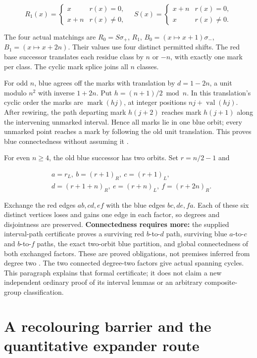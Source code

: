\documentclass[smallextended]{svjour3}
\begin{document}
\[
R_1(x)=\begin{cases}x&r(x)=0,\\x+n&r(x)\ne0,\end{cases}
\quad
S(x)=\begin{cases}x+n&r(x)=0,\\x&r(x)\ne0.\end{cases}
\]

The four actual matchings are \(R_0=S\sigma_+\), \(R_1\),
\(B_0=(x\mapsto x+1)\sigma_-\), \(B_1=(x\mapsto x+2n)\). Their values
use four distinct permitted shifts. The red base successor translates
each residue class by \(n\) or \(-n\), with exactly one mark per class.
The cyclic mark splice joins all \(n\) classes.

For odd \(n\), blue agrees off the marks with translation by \(d=1-2n\),
a unit modulo \(n^2\) with inverse \(1+2n\). Put \(h=(n+1)/2\bmod n\).
In this translation's cyclic order the marks are
\(\operatorname{mark}(hj)\), at integer positions
\(nj+\operatorname{val}(hj)\). After rewiring, the path departing mark
\(h(j+2)\) reaches mark \(h(j+1)\) along the intervening unmarked
interval. Hence all marks lie in one blue orbit; every unmarked point
reaches a mark by following the old unit translation. This proves blue
connectedness without assuming it \cite{ref11}.

For even \(n\ge4\), the old blue successor has two orbits. Set
\(r=n/2-1\) and

\[
\begin{aligned}
&a=r_L,\ b=(r+1)_R,\ c=(r+1)_L,\\
&d=(r+1+n)_R,\ e=(r+n)_L,\ f=(r+2n)_R.
\end{aligned}
\]

Exchange the red edges \(ab,cd,ef\) with the blue edges \(bc,de,fa\).
Each of these six distinct vertices loses and gains one edge in each
factor, so degrees and disjointness are preserved. \textbf{Connectedness
requires more:} the supplied interval-path certificate proves a
surviving red \(b\)-to-\(d\) path, surviving blue \(a\)-to-\(c\) and
\(b\)-to-\(f\) paths, the exact two-orbit blue partition, and global
connectedness of both exchanged factors. These are proved obligations,
not premises inferred from degree two \cite{ref11}. The two connected
degree-two factors give actual spanning cycles. This paragraph explains
that formal certificate; it does not claim a new independent ordinary
proof of its interval lemmas or an arbitrary composite-group
classification.

\section{A recolouring barrier and the quantitative expander
route}\label{a-recolouring-barrier-and-the-quantitative-expander-route}
\end{document}

